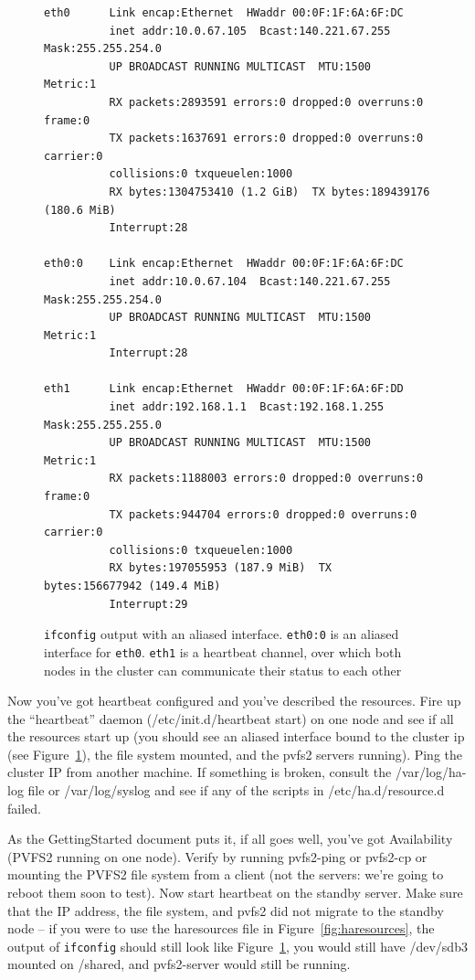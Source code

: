 \documentclass[11pt]{article}
\begin{document}
\begin{figure}
\begin{scriptsize}
\begin{verbatim}
eth0      Link encap:Ethernet  HWaddr 00:0F:1F:6A:6F:DC  
          inet addr:10.0.67.105  Bcast:140.221.67.255  Mask:255.255.254.0
          UP BROADCAST RUNNING MULTICAST  MTU:1500  Metric:1
          RX packets:2893591 errors:0 dropped:0 overruns:0 frame:0
          TX packets:1637691 errors:0 dropped:0 overruns:0 carrier:0
          collisions:0 txqueuelen:1000 
          RX bytes:1304753410 (1.2 GiB)  TX bytes:189439176 (180.6 MiB)
          Interrupt:28 

eth0:0    Link encap:Ethernet  HWaddr 00:0F:1F:6A:6F:DC  
          inet addr:10.0.67.104  Bcast:140.221.67.255  Mask:255.255.254.0
          UP BROADCAST RUNNING MULTICAST  MTU:1500  Metric:1
          Interrupt:28 

eth1      Link encap:Ethernet  HWaddr 00:0F:1F:6A:6F:DD  
          inet addr:192.168.1.1  Bcast:192.168.1.255  Mask:255.255.255.0
          UP BROADCAST RUNNING MULTICAST  MTU:1500  Metric:1
          RX packets:1188003 errors:0 dropped:0 overruns:0 frame:0
          TX packets:944704 errors:0 dropped:0 overruns:0 carrier:0
          collisions:0 txqueuelen:1000 
          RX bytes:197055953 (187.9 MiB)  TX bytes:156677942 (149.4 MiB)
          Interrupt:29 
\end{verbatim}
\end{scriptsize}
\caption{\texttt{ifconfig} output with an aliased interface. \texttt{eth0:0} is
an aliased interface for \texttt{eth0}.  \texttt{eth1} is a heartbeat channel,
over which both nodes in the cluster can communicate their status to each
other}
\label{fig:alias}
\end{figure}

Now you've got heartbeat configured and you've described the resources.
Fire up the ``heartbeat'' daemon (/etc/init.d/heartbeat start) on one
node and see if all the resources start up (you should see an aliased
interface bound to the cluster ip (see Figure~\ref{fig:alias}), the file system mounted, and the
pvfs2 servers running).
Ping the cluster IP from another machine.  If something is broken,
consult the /var/log/ha-log file or /var/log/syslog and see if any of
the scripts in /etc/ha.d/resource.d failed.

As the GettingStarted document puts it, if all goes well, you've got
Availability (PVFS2 running on one node).  Verify by running pvfs2-ping
or pvfs2-cp or mounting the PVFS2 file system from a client (not the
servers: we're going to reboot them soon to test).  Now start heartbeat
on the standby server.  Make sure that the IP address, the file system,
and pvfs2 did not migrate to the standby node --  if you were to use the
haresources file in Figure~\ref{fig:haresources}, the output of
\texttt{ifconfig} should still look like Figure~\ref{fig:alias}, you
would still have /dev/sdb3 mounted on /shared, and pvfs2-server would
still be running. 
\end{document}
